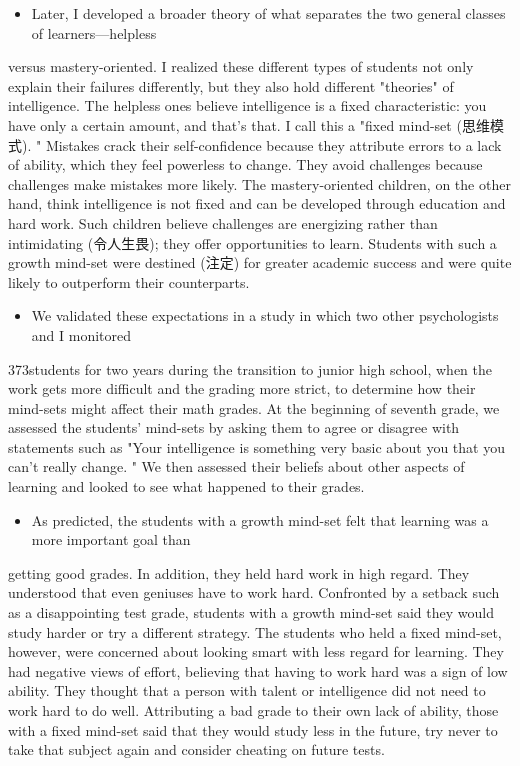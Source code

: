 \documentclass[UTF8,11pt]{ctexart}
\begin{document}
\begin{itemize}[leftmargin=2em,itemsep=.2em,topsep=.4em]\item[D.] Later, I developed a broader theory of what separates the two general classes of learners—helpless
\end{itemize}

versus mastery-oriented. I realized these different types of students not only explain their failures differently, but they also hold different "theories" of intelligence. The helpless ones believe intelligence is a fixed characteristic: you have only a certain amount, and that's that. I call this a "fixed mind-set (思维模式). " Mistakes crack their self-confidence because they attribute errors to a lack of ability, which they feel powerless to change. They avoid challenges because challenges make mistakes more likely. The mastery-oriented children, on the other hand, think intelligence is not fixed and can be developed through education and hard work. Such children believe challenges are energizing rather than intimidating (令人生畏); they offer opportunities to learn. Students with such a growth mind-set were destined (注定) for greater academic success and were quite likely to outperform their counterparts.


\begin{itemize}[leftmargin=2em,itemsep=.2em,topsep=.4em]\item[E.] We validated these expectations in a study in which two other psychologists and I monitored
\end{itemize}

373students for two years during the transition to junior high school, when the work gets more difficult and the grading more strict, to determine how their mind-sets might affect their math grades. At the beginning of seventh grade, we assessed the students' mind-sets by asking them to agree or disagree with statements such as "Your intelligence is something very basic about you that you can't really change. " We then assessed their beliefs about other aspects of learning and looked to see what happened to their grades.


\begin{itemize}[leftmargin=2em,itemsep=.2em,topsep=.4em]\item[F.] As predicted, the students with a growth mind-set felt that learning was a more important goal than
\end{itemize}

getting good grades. In addition, they held hard work in high regard. They understood that even geniuses have to work hard. Confronted by a setback such as a disappointing test grade, students with a growth mind-set said they would study harder or try a different strategy. The students who held a fixed mind-set, however, were concerned about looking smart with less regard for learning. They had negative views of effort, believing that having to work hard was a sign of low ability. They thought that a person with talent or intelligence did not need to work hard to do well. Attributing a bad grade to their own lack of ability, those with a fixed mind-set said that they would study less in the future, try never to take that subject again and consider cheating on future tests.
\end{document}
